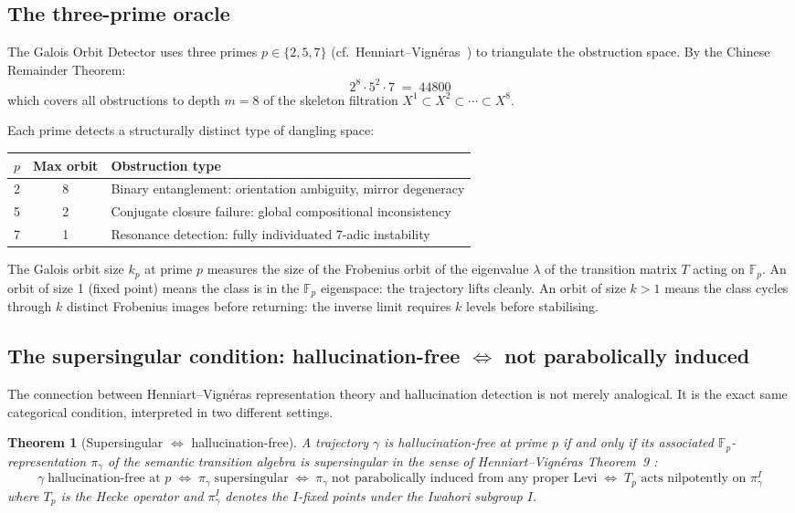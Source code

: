 \documentclass[11pt,a4paper]{article}
\newtheorem{theorem}{Theorem}[section]
\begin{document}
\subsection{The three-prime oracle}

The Galois Orbit Detector uses three primes $p \in \{2, 5, 7\}$
(cf.\ Henniart--Vign\'{e}ras~\cite{HV17}) to triangulate the
obstruction space.
By the Chinese Remainder Theorem:
\[
  2^8 \cdot 5^2 \cdot 7 \;=\; 44800
\]
which covers all obstructions to depth $m=8$ of the skeleton
filtration $X^1 \subset X^2 \subset \cdots \subset X^8$.

Each prime detects a structurally distinct type of dangling space:
\begin{center}
\renewcommand{\arraystretch}{1.3}\small
\begin{tabular}{ccp{5.5cm}}
\toprule
$p$ & Max orbit & Obstruction type \\
\midrule
2 & 8 & Binary entanglement: orientation ambiguity, mirror degeneracy \\
5 & 2 & Conjugate closure failure: global compositional inconsistency \\
7 & 1 & Resonance detection: fully individuated 7-adic instability \\
\bottomrule
\end{tabular}
\end{center}

The Galois orbit size $k_p$ at prime $p$ measures the size of the
Frobenius orbit of the eigenvalue $\lambda$ of the transition matrix
$T$ acting on $\mathbb{F}_p$.
An orbit of size 1 (fixed point) means the class is in the
$\mathbb{F}_p$ eigenspace: the trajectory lifts cleanly.
An orbit of size $k > 1$ means the class cycles through $k$ distinct
Frobenius images before returning: the inverse limit requires
$k$ levels before stabilising.


\subsection{The supersingular condition: hallucination-free $\iff$ not parabolically induced}
\label{sec:supersingular}

The connection between Henniart--Vign\'{e}ras representation theory
and hallucination detection is not merely analogical.
It is the exact same categorical condition, interpreted in two
different settings.

\begin{theorem}[Supersingular $\iff$ hallucination-free]
\label{thm:supersingular}
A trajectory $\gamma$ is hallucination-free at prime $p$ if and only
if its associated $\mathbb{F}_p$-representation $\pi_\gamma$ of the
semantic transition algebra is \emph{supersingular} in the sense of
Henniart--Vign\'{e}ras Theorem~9 \cite{HV17}:
\[
  \gamma \;\text{hallucination-free at }p
  \;\iff\;
  \pi_\gamma \;\text{supersingular}
  \;\iff\;
  \pi_\gamma \;\text{not parabolically induced from any proper Levi}
  \;\iff\;
  T_p \text{ acts nilpotently on } \pi_\gamma^I
\]
where $T_p$ is the Hecke operator and $\pi_\gamma^I$ denotes the
$I$-fixed points under the Iwahori subgroup $I$.
\end{theorem}
\end{document}
